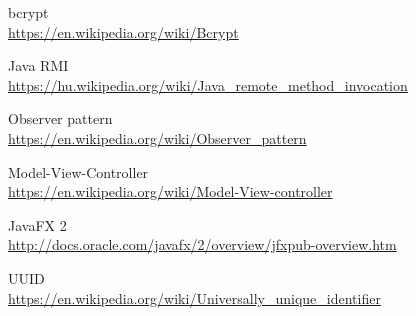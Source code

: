 \begin{thebibliography}{9}
bcrypt \\
\url{https://en.wikipedia.org/wiki/Bcrypt}

Java RMI \\
\url{https://hu.wikipedia.org/wiki/Java_remote_method_invocation}

Observer pattern \\
\url{https://en.wikipedia.org/wiki/Observer_pattern}

Model-View-Controller \\
\url{https://en.wikipedia.org/wiki/Model-View-controller}

JavaFX 2 \\
\url{http://docs.oracle.com/javafx/2/overview/jfxpub-overview.htm}

UUID \\
\url{https://en.wikipedia.org/wiki/Universally_unique_identifier}



\end{thebibliography}
